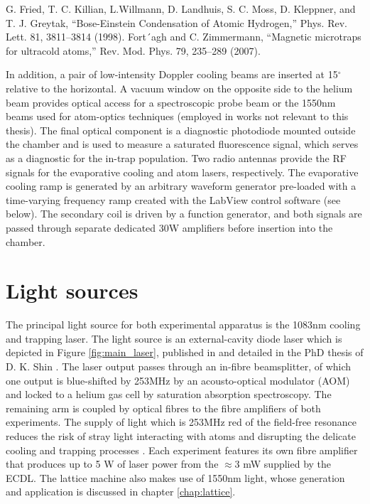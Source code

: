 	G.
	Fried, T.
	C.
	Killian, L.Willmann, D.
	Landhuis, S.
	C.
	Moss, D.
	Kleppner, and T.
	J.
	Greytak, ``Bose-Einstein Condensation of Atomic Hydrogen,'' Phys.
	Rev.
	Lett.
	81, 3811–3814 (1998).
	Fort´agh and C.
	Zimmermann, ``Magnetic microtraps for ultracold atoms,'' Rev.
	Mod.
	Phys.
	79, 235–289 (2007).

	In addition, a pair of low-intensity Doppler cooling beams  are inserted at 15$^\circ$ relative to the horizontal.
	A vacuum window on the opposite side to the helium beam provides optical access for a spectroscopic probe beam or the 1550nm beams used for atom-optics techniques (employed in works not relevant to this thesis).
	The final optical component is a diagnostic photodiode mounted outside the chamber and is used to measure a saturated fluorescence signal, which serves as a diagnostic for the in-trap population.
	Two radio antennas provide the RF signals for the evaporative cooling and atom lasers, respectively.
	The evaporative cooling ramp is generated by an arbitrary waveform generator pre-loaded with a time-varying frequency ramp created with the LabView control software (see below).
	The secondary coil is driven by a function generator, and both signals are passed through separate dedicated 30W amplifiers before insertion into the chamber.



\section{Light sources}\label{ssec:lasers}
	
	The principal light source for both experimental apparatus is the 1083nm cooling and trapping laser.
	The light source is an external-cavity diode laser which is depicted in Figure \ref{fig:main_laser}, published in \cite{shin16} and detailed in the PhD thesis of D.
	K.
	Shin \cite{ShinThesis}.
	The laser output passes through an in-fibre beamsplitter, of which one output is blue-shifted by 253MHz by an acousto-optical modulator (AOM) and locked to a helium gas cell by saturation absorption spectroscopy.
	The remaining arm is coupled by optical fibres to the fibre amplifiers of both experiments.
	The supply of light which is 253MHz red of the field-free resonance reduces the risk of stray light interacting with atoms and disrupting the delicate cooling and trapping processes .
	Each experiment features its own fibre amplifier that produces up to 5 W of laser power from the $\approx$3 mW supplied by the ECDL.
	The lattice machine also makes use of 1550nm light, whose generation and application is discussed in chapter \ref{chap:lattice}.

